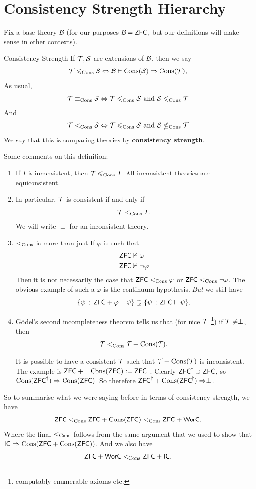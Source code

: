 \documentclass{article}
\begin{document}
\section{Consistency Strength Hierarchy}
Fix a base theory $\mathcal{B}$ (for our purposes $\mathcal{B} = \mathsf{ZFC}$, but our definitions will make sense in other contexts). 
\begin{fancydefine}{Consistency Strength}
    If $\mathcal{T}, \mathcal{S}$ are extensions of $\mathcal{B}$, then we say \[ \mathcal{T} \leqslant_{\operatorname{Cons}} \mathcal{S} \Leftrightarrow \mathcal{B} \vdash \operatorname{Cons}(\mathcal{S}) \Rightarrow \operatorname{Cons}(\mathcal{T}),\]
    As usual, \[\mathcal{T} \equiv_{\operatorname{Cons}} \mathcal{S} \Leftrightarrow \mathcal{T} \leqslant_{\operatorname{Cons}} \mathcal{S} \text{ and } \mathcal{S} \leqslant_{\operatorname{Cons}} \mathcal{T} \]
    And \[ \mathcal{T} <_{\operatorname{Cons}} \mathcal{S} \Leftrightarrow \mathcal{T} \leqslant_{\operatorname{Cons}} \mathcal{S} \text{ and } \mathcal{S} \nleq_{\operatorname{Cons}} \mathcal{T}\] We say that this is comparing theories by \textbf{consistency strength}.
\end{fancydefine}
Some comments on this definition:
\begin{enumerate}
    \item If $I$ is inconsistent, then $\mathcal{T} \leqslant_{\operatorname{Cons}} I$. All inconsistent theories are equiconsistent.
    \item In particular, $\mathcal{T}$ is consistent if and only if \[ \mathcal{T} <_{\operatorname{Cons}} I.\]
    We will write $\perp$ for an inconsistent theory.
    \item $<_{\operatorname{Cons}}$ is more than just  If $\varphi$ is such that 
    \begin{align*}
        \mathsf{ZFC} &\nvdash \varphi\\
        \mathsf{ZFC} &\nvdash \neg \varphi
    \end{align*}
    Then it is not necessarily the case that $\mathsf{ZFC} <_{\operatorname{Cons}} \varphi$ or $\mathsf{ZFC} <_{\operatorname{Cons}} \neg \varphi$. The obvious example of such a $\varphi$ is the continuum hypothesis. \textit{But} we still have \[ \{ \psi \, : \, \mathsf{ZFC} + \varphi \vdash \psi\} \supsetneq \{\psi \, : \, \mathsf{ZFC} \vdash \psi\}.\]
    \item G\"odel's second incompleteness theorem tells us that (for nice $\mathcal{T}$ \footnote{computably enumerable axioms etc.}) if $\mathcal{T} \neq \perp$, then \[ \mathcal{T} <_{\operatorname{Cons}} \mathcal{T} + \operatorname{Cons}(\mathcal{T}).\]
    \begin{remark*}
        It is possible to have a consistent $\mathcal{T}$ such that $\mathcal{T} + \operatorname{Cons}(\mathcal{T})$ is inconsistent. The example is $\mathsf{ZFC} + \neg \operatorname{Cons}(\mathsf{ZFC}) := \mathsf{ZFC}^{\dagger}$. Clearly $\mathsf{ZFC}^{\dagger} \supset \mathsf{ZFC}$, so $\operatorname{Cons}(\mathsf{ZFC}^{\dagger}) \Rightarrow \operatorname{Cons}(\mathsf{ZFC})$. So therefore $\mathsf{ZFC}^{\dagger} + \operatorname{Cons}(\mathsf{ZFC}^{\dagger}) \Rightarrow \perp$.
    \end{remark*}  
\end{enumerate}
So to summarise what we were saying before in terms of consistency strength, we have \[ \mathsf{ZFC} <_{\operatorname{Cons}} \mathsf{ZFC}+ \operatorname{Cons}(\mathsf{ZFC}) <_{\operatorname{Cons}} \mathsf{ZFC} + \mathsf{WorC}.\]
Where the final $<_{\operatorname{Cons}}$ follows from the same argument that we used to show that $\mathsf{IC} \Rightarrow \operatorname{Cons}(\mathsf{ZFC} + \operatorname{Cons}(\mathsf{ZFC}))$. And we also have \[\mathsf{ZFC} + \mathsf{WorC} <_{\operatorname{Cons}} \mathsf{ZFC} + \mathsf{IC}.\]
\end{document}

